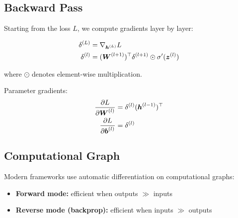 \subsection{Backward Pass}

Starting from the loss $L$, we compute gradients layer by layer:

\begin{align}
\delta^{(L)} &= \nabla_{\boldsymbol{h}^{(L)}} L \\
\delta^{(l)} &= (\boldsymbol{W}^{(l+1)})^\top \delta^{(l+1)} \odot \sigma'(\boldsymbol{z}^{(l)})
\end{align}

where $\odot$ denotes element-wise multiplication.

Parameter gradients:
\begin{align}
\frac{\partial L}{\partial \boldsymbol{W}^{(l)}} &= \delta^{(l)} (\boldsymbol{h}^{(l-1)})^\top \\
\frac{\partial L}{\partial \boldsymbol{b}^{(l)}} &= \delta^{(l)}
\end{align}

\subsection{Computational Graph}

Modern frameworks use automatic differentiation on computational graphs:
\begin{itemize}
    \item \textbf{Forward mode:} efficient when outputs $\gg$ inputs
    \item \textbf{Reverse mode (backprop):} efficient when inputs $\gg$ outputs
\end{itemize}


